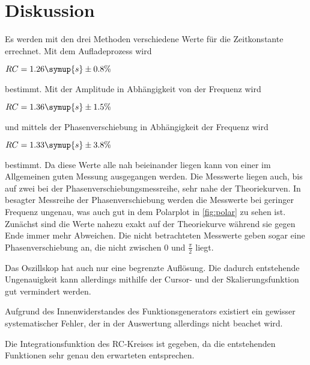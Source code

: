 \section{Diskussion}
\label{sec:Diskussion}

Es werden mit den drei Methoden verschiedene Werte für die Zeitkonstante errechnet.
Mit dem Aufladeprozess wird 

\begin{center}
    $RC = 1.26 \symup{s} \pm 0.8 \%$
\end{center}

bestimmt. Mit der Amplitude in Abhängigkeit von der Frequenz wird 

\begin{center}
    $RC = 1.36 \symup{s} \pm 1.5 \%$
\end{center}

und mittels der Phasenverschiebung in Abhängigkeit der Frequenz wird

\begin{center}
    $RC = 1.33 \symup{s} \pm 3.8\%$
\end{center}

bestimmt. Da diese Werte alle nah beieinander liegen kann von einer im Allgemeinen guten Messung ausgegangen werden.
Die Messwerte liegen auch, bis auf zwei bei der Phasenverschiebungsmessreihe, sehr nahe der Theoriekurven.
In besagter Messreihe der Phasenverschiebung werden die Messwerte bei geringer Frequenz ungenau, was auch gut in dem Polarplot in \autoref{fig:polar} zu sehen ist.
Zunächst sind die Werte nahezu exakt auf der Theoriekurve während sie gegen Ende immer mehr Abweichen. Die nicht betrachteten Messwerte geben sogar eine Phasenverschiebung an, die nicht zwischen $0$ und $\frac{\pi}{2}$ liegt.

Das Oszillskop hat auch nur eine begrenzte Auflösung. Die dadurch entstehende Ungenauigkeit kann allerdings mithilfe der Cursor- und der Skalierungsfunktion gut vermindert werden.

Aufgrund des Innenwiderstandes des Funktionsgenerators existiert ein gewisser systematischer Fehler, der in der Auswertung allerdings nicht beachet wird.

Die Integrationsfunktion des RC-Kreises ist gegeben, da die entstehenden Funktionen sehr genau den erwarteten entsprechen.